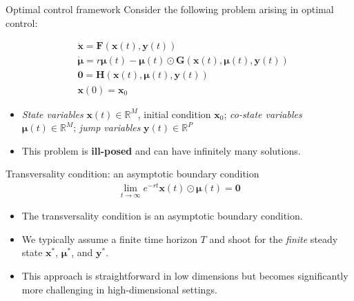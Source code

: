 \documentclass[aspectratio=169,10pt]{beamer}
\newcommand{\emphcolor}[1]{\textbf{\textcolor{emphcolorval}{#1}}}
\newcommand{\R}{\ensuremath{\mathbb{R}}}
\begin{document}
\begin{frame}{Optimal control framework}
	Consider the following problem arising in optimal control:
	
	\begin{align*}
		&\dot{\boldsymbol{x}} = \boldsymbol{F}\left(\boldsymbol{x}(t),\boldsymbol{y}(t)\right)\\
		&\dot{\boldsymbol{\mu}} = r\boldsymbol{\mu}(t)-\boldsymbol{\mu}(t)\odot \boldsymbol{G}\left(\boldsymbol{x}(t),\boldsymbol{\mu}(t),\boldsymbol{y}(t)\right)\\
		&\boldsymbol{0}= \boldsymbol{H}\left(\boldsymbol{x}(t),\boldsymbol{\mu}(t),\boldsymbol{y}(t)\right)\\
		&\boldsymbol{x}(0) = \boldsymbol{x}_0
	\end{align*}
	\begin{itemize}
		\item \emph{State variables} $\boldsymbol{x}(t)\in\R^{M}$, initial condition $\boldsymbol{x}_0$; \emph{co-state variables} $\boldsymbol{\mu}(t)\in\R^{M}$; \emph{jump variables} $\boldsymbol{y}(t)\in\R^{P}$
		\item This problem is \emphcolor{ill-posed} and can have infinitely many solutions.
	\end{itemize}
\end{frame}

\begin{frame}{Transversality condition: an asymptotic boundary condition}
	\begin{align*}
		\lim_{t\rightarrow \infty} e^{-rt} \boldsymbol{x}(t)\odot\boldsymbol{\mu}(t) = \boldsymbol{0}
	\end{align*}
	\begin{itemize}
	\item The transversality condition is an asymptotic boundary condition.
	\item We typically assume a finite time horizon \( T \) and shoot for the \emph{finite} steady state \( \boldsymbol{x}^* \), \( \boldsymbol{\mu}^* \), and \( \boldsymbol{y}^* \).
	\item This approach is straightforward in low dimensions but becomes significantly more challenging in high-dimensional settings.
	\end{itemize}
\end{frame}
\end{document}
